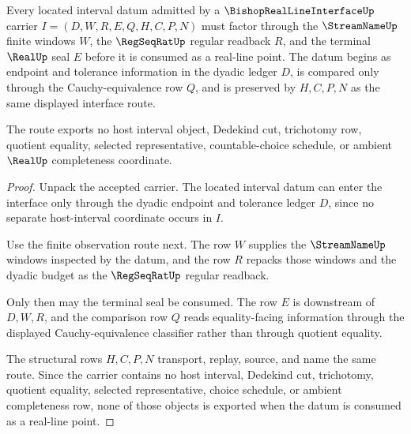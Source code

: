 \begin{theorem}
\label{thm:bishop-real-line-located-interval-stream-route}
Every located interval datum admitted by a $\BishopRealLineInterfaceUp$ carrier $I=(D,W,R,E,Q,H,C,P,N)$ must factor through the $\StreamNameUp$ finite windows $W$, the $\RegSeqRatUp$ regular readback $R$, and the terminal $\RealUp$ seal $E$ before it is consumed as a real-line point. The datum begins as endpoint and tolerance information in the dyadic ledger $D$, is compared only through the Cauchy-equivalence row $Q$, and is preserved by $H,C,P,N$ as the same displayed interface route.

The route exports no host interval object, Dedekind cut, trichotomy row, quotient equality, selected representative, countable-choice schedule, or ambient $\RealUp$ completeness coordinate.
\end{theorem}
\begin{proof}
Unpack the accepted carrier. The located interval datum can enter the interface only through the dyadic endpoint and tolerance ledger $D$, since no separate host-interval coordinate occurs in $I$.

Use the finite observation route next. The row $W$ supplies the $\StreamNameUp$ windows inspected by the datum, and the row $R$ repacks those windows and the dyadic budget as the $\RegSeqRatUp$ regular readback.

Only then may the terminal seal be consumed. The row $E$ is downstream of $D,W,R$, and the comparison row $Q$ reads equality-facing information through the displayed Cauchy-equivalence classifier rather than through quotient equality.

The structural rows $H,C,P,N$ transport, replay, source, and name the same route. Since the carrier contains no host interval, Dedekind cut, trichotomy, quotient equality, selected representative, choice schedule, or ambient completeness row, none of those objects is exported when the datum is consumed as a real-line point.
\end{proof}

